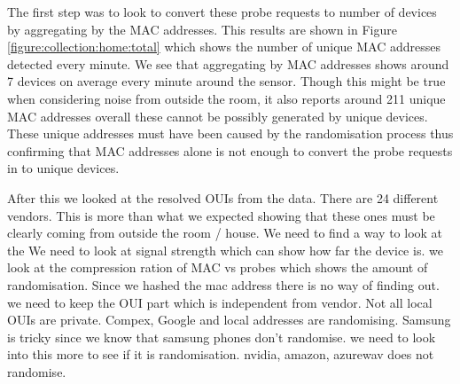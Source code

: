 The first step was to look to convert these probe requests to number of devices by aggregating by the MAC addresses.
This results are shown in Figure \ref{figure:collection:home:total} which shows the number of unique MAC addresses detected every minute.
We see that aggregating by MAC addresses shows around 7 devices on average every minute around the sensor.
Though this might be true when considering noise from outside the room, it also reports around 211 unique MAC addresses overall these cannot be possibly generated by unique devices.
These unique addresses must have been caused by the randomisation process thus confirming that MAC addresses alone is not enough to convert the probe requests in to unique devices.

After this we looked at the resolved OUIs from the data.
There are 24 different vendors.
This is more than what we expected showing that these ones must be clearly coming from outside the room / house.
We need to find a way to look at the
We need to look at signal strength which can show how far the device is.
we look at the compression ration of MAC vs probes which shows the amount of randomisation.
Since we hashed the mac address there is no way of finding out. we need to keep the OUI part which is independent from vendor. Not all local OUIs are private.
Compex, Google and local addresses are randomising.
Samsung is tricky since we know that samsung phones don't randomise. we need to look into this more to see if it is randomisation.
nvidia, amazon, azurewav does not randomise.

